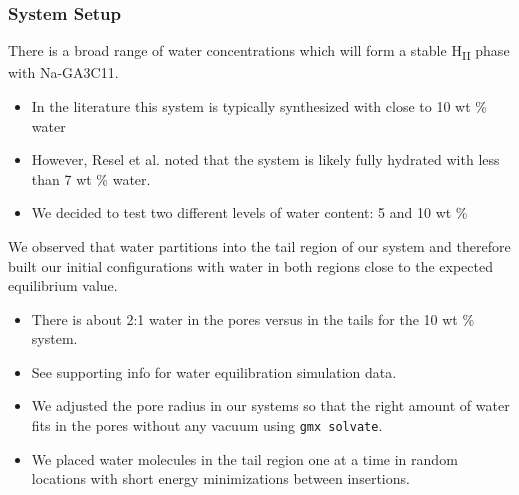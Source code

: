 \documentclass{article}
\begin{document}
  \subsubsection*{System Setup}

  There is a broad range of water concentrations which will form a stable 
  H\textsubscript{II} phase with Na-GA3C11. 
  \begin{itemize}
	\item In the literature this system is typically synthesized with close
	to 10 wt \% water
        \item However, Resel et al. noted that the system is likely fully 
	hydrated with less than 7 wt \% water.
	\item We decided to test two different levels of water content: 5 and 10 wt \%
  \end{itemize} 

  We observed that water partitions into the tail region of our system and therefore
  built our initial configurations with water in both regions close to the expected
  equilibrium value.
  \begin{itemize}
	\item There is about 2:1 water in the pores versus in the tails for the 10 wt \% system.
	\item See supporting info for water equilibration simulation data.
	\item We adjusted the pore radius in our systems so that the right amount of water
	fits in the pores without any vacuum using \texttt{gmx solvate}.
	\item We placed water molecules in the tail region one at a time in random locations
	with short energy minimizations between insertions.
  \end{itemize}

\end{document}
